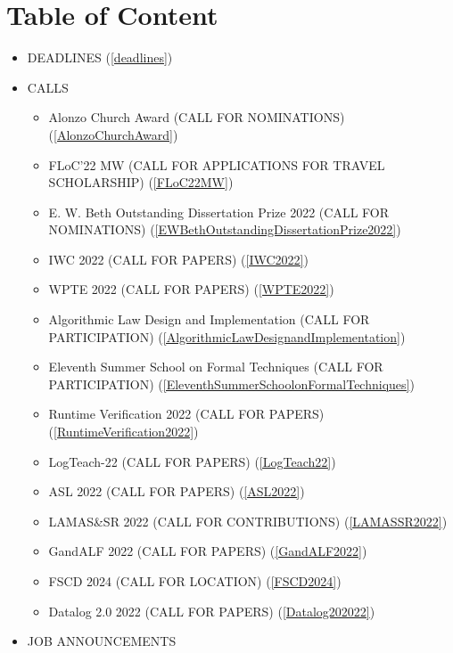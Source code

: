 \documentclass[prodmode,acmtecs]{acmsmall} %
\begin{document}
\section{Table of Content}\begin{itemize}\item DEADLINES (\cref{deadlines}) 
 
\item CALLS 
 
\begin{itemize}\item Alonzo Church Award (CALL FOR NOMINATIONS) (\cref{AlonzoChurchAward})
\item FLoC'22 MW (CALL FOR APPLICATIONS FOR TRAVEL SCHOLARSHIP) (\cref{FLoC22MW})
\item E. W. Beth Outstanding Dissertation Prize 2022 (CALL FOR NOMINATIONS) (\cref{EWBethOutstandingDissertationPrize2022})
\item IWC 2022 (CALL FOR PAPERS) (\cref{IWC2022})
\item WPTE 2022 (CALL FOR PAPERS) (\cref{WPTE2022})
\item Algorithmic Law Design and Implementation (CALL FOR PARTICIPATION) (\cref{AlgorithmicLawDesignandImplementation})
\item Eleventh Summer School on Formal Techniques (CALL FOR PARTICIPATION) (\cref{EleventhSummerSchoolonFormalTechniques})
\item Runtime Verification 2022 (CALL FOR PAPERS) (\cref{RuntimeVerification2022})
\item LogTeach-22 (CALL FOR PAPERS) (\cref{LogTeach22})
\item ASL 2022 (CALL FOR PAPERS) (\cref{ASL2022})
\item LAMAS\&SR 2022 (CALL FOR CONTRIBUTIONS) (\cref{LAMASSR2022})
\item GandALF 2022 (CALL FOR PAPERS) (\cref{GandALF2022})
\item FSCD 2024 (CALL FOR LOCATION) (\cref{FSCD2024})
\item Datalog 2.0 2022 (CALL FOR PAPERS) (\cref{Datalog202022})
\end{itemize} 
\item JOB ANNOUNCEMENTS 
 

\end{itemize}
\end{document}
